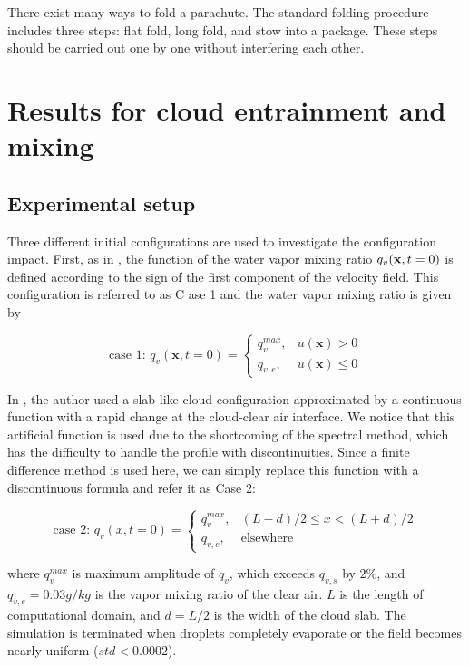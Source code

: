 There exist many ways to fold a parachute. The standard folding procedure includes three steps: flat fold, long fold, and stow into a package. These steps should be carried out one by one without interfering each other.
\section{Results for cloud entrainment and mixing}
\subsection{Experimental setup}
Three different initial configurations are used to investigate
the configuration impact. First, as in \cite{And04}, the function of the water vapor mixing 
ratio $q_v(\mathbf{x}, t = 0)$ is defined according to the sign of the first component of the velocity 
field. This configuration is referred to as C ase 1 and the water vapor mixing ratio is
given by

\begin{equation}
\mbox{case 1: } q_v(\mathbf{x},t=0) = 
\left\{\begin{array}{lr}
q_v^{max}, & u(\mathbf{x}) > 0\\
q_{v,e}, & u(\mathbf{x}) \le 0
\end{array}\right.\label{case1}
\end{equation}

In \cite{Kumar11}, the author used a slab-like cloud configuration approximated by a continuous 
function with a rapid change at the cloud-clear air interface. We notice that this artificial function is 
used due to the shortcoming of the spectral method, which has the difficulty to handle the profile with discontinuities. Since a finite difference method is used here, we can simply replace this function with a discontinuous formula and refer it as Case 2:

\begin{equation}
\mbox{case 2: } q_v(x,t=0) = 
\left\{\begin{array}{lr}
q_v^{max}, & (L-d)/2 \le x < (L+d)/2\\
q_{v,e}, & \mbox{elsewhere}
\end{array}\right.\label{case2}
\end{equation}

where $q_v^{max}$ is maximum amplitude of $q_v$, which exceeds $q_{v,s}$ by
$2\%$, and $q_{v,e} = 0.03g/kg$ is the vapor mixing ratio of the clear air. $L$
is the length of computational domain, and $d = L/2$ is the width of the cloud
slab. The simulation is terminated when droplets completely evaporate or the
field becomes nearly uniform ($std<0.0002$).

